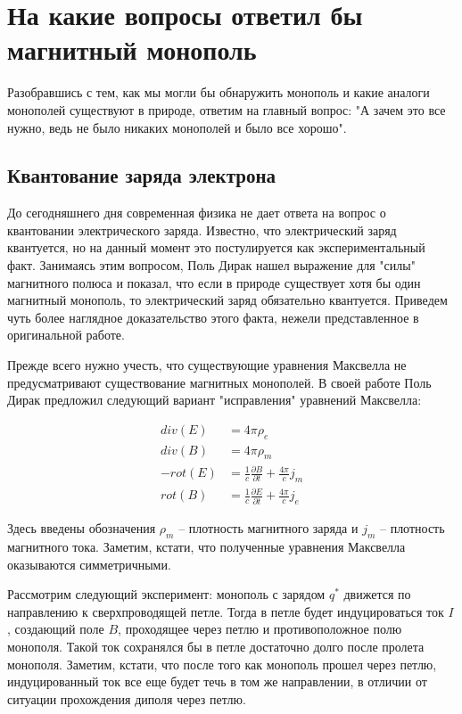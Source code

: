 \documentclass[a4paper, 12pt]{article}
\begin{document}
\section{На какие вопросы ответил бы магнитный монополь}
Разобравшись с тем, как мы могли бы обнаружить монополь и какие аналоги монополей существуют в природе, ответим на главный вопрос: "А зачем это все нужно, ведь не было никаких монополей и было все хорошо". 

\subsection{Квантование заряда электрона}
До сегодняшнего дня современная физика не дает ответа на вопрос о квантовании электрического заряда. Известно, что электрический заряд квантуется, но на данный момент это постулируется как экспериментальный факт. Занимаясь этим вопросом, Поль Дирак нашел выражение для "силы" магнитного полюса и показал, что если в природе существует хотя бы один магнитный монополь, то электрический заряд обязательно квантуется. Приведем чуть более наглядное доказательство этого факта, нежели представленное в оригинальной работе.


Прежде всего нужно учесть, что существующие уравнения Максвелла не предусматривают существование магнитных монополей. В своей работе Поль Дирак предложил следующий вариант "исправления" уравнений Максвелла:

\begin{align*}
    div(E) &= 4\pi\rho_e \\
    div(B) &= 4 \pi \rho_m \\
    -rot(E) &= \frac{1}{c} \frac{\partial B}{\partial t} + \frac{4\pi}{c}j_m \\
    rot(B) &= \frac{1}{c} \frac{\partial E}{\partial t} + \frac{4\pi}{c}j_e 
\end{align*}

Здесь введены обозначения $\rho_m$ -- плотность магнитного заряда и $j_m$ -- плотность магнитного тока. Заметим, кстати, что полученные уравнения Максвелла оказываются симметричными.

Рассмотрим следующий эксперимент: монополь с зарядом $q^*$ движется по направлению к сверхпроводящей петле. Тогда в петле будет индуцироваться ток $I$, создающий поле $B$, проходящее через петлю и противоположное полю монополя. Такой ток сохранялся бы в петле достаточно долго после пролета монополя. Заметим, кстати, что после того как монополь прошел через петлю, индуцированный ток все еще будет течь в том же направлении, в отличии от ситуации прохождения диполя через петлю. 
\end{document}
